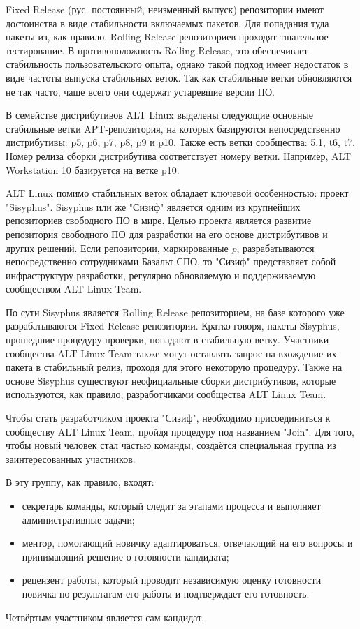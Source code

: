 \documentclass[bachelor, och, pract]{SCWorks}
\begin{document}
Fixed Release (рус. постоянный, неизменный выпуск) репозитории имеют достоинства в виде стабильности включаемых пакетов.
Для попадания туда пакеты из, как правило, Rolling Release репозиториев проходят тщательное тестирование.
В противоположность Rolling Release, это обеспечивает стабильность пользовательского опыта, однако такой подход имеет недостаток в виде частоты выпуска стабильных веток.
Так как стабильные ветки обновляются не так часто, чаще всего они содержат устаревшие версии ПО.

В семействе дистрибутивов ALT Linux выделены следующие основные стабильные ветки APT-репозитория, на которых базируются непосредственно дистрибутивы: p5, p6, p7, p8, p9 и p10.
Также есть ветки сообщества: 5.1, t6, t7. Номер релиза сборки дистрибутива соответствует номеру ветки.
Например, ALT Workstation 10 базируется на ветке p10.

ALT Linux помимо стабильных веток обладает ключевой особенностью: проект "Sisyphus".
Sisyphus или же "Сизиф" является одним из крупнейших репозиториев свободного ПО в мире.
Целью проекта является развитие репозитория свободного ПО для разработки на его основе дистрибутивов и других решений.
Если репозитории, маркированные \textit{p}, разрабатываются непосредственно сотрудниками Базальт СПО, то "Сизиф" представляет собой инфраструктуру разработки,
регулярно обновляемую и поддерживаемую сообществом ALT Linux Team\cite{a_sisyphus}.

По сути Sisyphus является Rolling Release репозиторием, на базе которого уже разрабатываются Fixed Release репозитории.
Кратко говоря, пакеты Sisyphus, прошедшие процедуру проверки, попадают в стабильную ветку.
Участники сообщества ALT Linux Team также могут оставлять запрос на вхождение их пакета в стабильный релиз, проходя для этого некоторую процедуру.
Также на основе Sisyphus существуют неофициальные сборки дистрибутивов, которые используются, как правило, разработчиками сообщества ALT Linux Team.

Чтобы стать разработчиком проекта "Сизиф", необходимо присоединиться к сообществу ALT Linux Team, пройдя процедуру под названием "Join". 
Для того, чтобы новый человек стал частью команды, создаётся специальная группа из заинтересованных участников.

В эту группу, как правило, входят:
\begin{itemize}
    \item секретарь команды, который следит за этапами процесса и выполняет административные задачи;
    \item ментор, помогающий новичку адаптироваться, отвечающий на его вопросы и принимающий решение о готовности кандидата;
    \item рецензент работы, который проводит независимую оценку готовности новичка по результатам его работы и подтверждает его готовность.
\end{itemize}
Четвёртым участником является сам кандидат.
\end{document}

